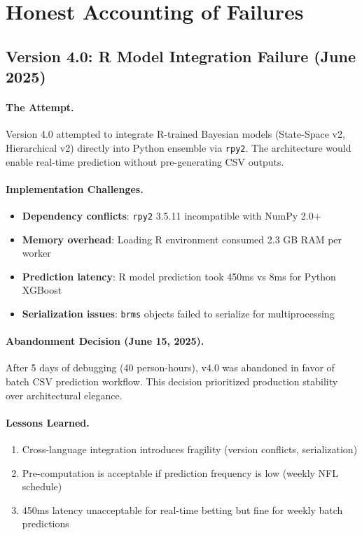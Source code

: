 \section{Honest Accounting of Failures}
\label{sec:arch-failures}

\subsection{Version 4.0: R Model Integration Failure (June 2025)}

\paragraph{The Attempt.}
Version 4.0 attempted to integrate R-trained Bayesian models (State-Space v2, Hierarchical v2) directly into Python ensemble via \texttt{rpy2}. The architecture would enable real-time prediction without pre-generating CSV outputs.

\paragraph{Implementation Challenges.}
\begin{itemize}[itemsep=2pt,parsep=0pt]
    \item \textbf{Dependency conflicts}: \texttt{rpy2} 3.5.11 incompatible with NumPy 2.0+
    \item \textbf{Memory overhead}: Loading R environment consumed 2.3 GB RAM per worker
    \item \textbf{Prediction latency}: R model prediction took 450ms vs 8ms for Python XGBoost
    \item \textbf{Serialization issues}: \texttt{brms} objects failed to serialize for multiprocessing
\end{itemize}

\paragraph{Abandonment Decision (June 15, 2025).}
After 5 days of debugging (40 person-hours), v4.0 was abandoned in favor of batch CSV prediction workflow. This decision prioritized production stability over architectural elegance.

\paragraph{Lessons Learned.}
\begin{enumerate}[itemsep=2pt,parsep=0pt]
    \item Cross-language integration introduces fragility (version conflicts, serialization)
    \item Pre-computation is acceptable if prediction frequency is low (weekly NFL schedule)
    \item 450ms latency unacceptable for real-time betting but fine for weekly batch predictions
\end{enumerate}

